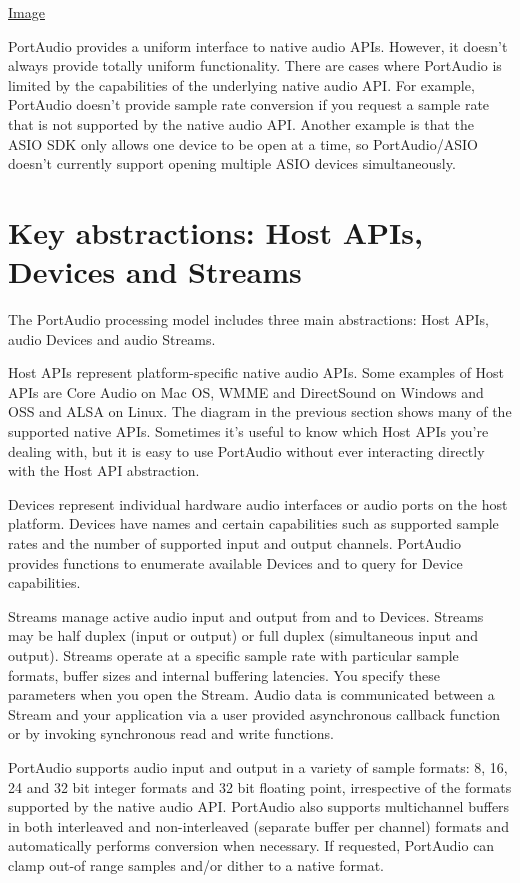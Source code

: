 \documentclass[a4paper]{report}
\begin{document}
\href{./img/portaudio-external-architecture-diagram.png}{Image}


PortAudio provides a uniform interface to native audio APIs. However, it doesn't always provide totally uniform functionality. There are cases where PortAudio is limited by the capabilities of the underlying native audio API. For example, PortAudio doesn't provide sample rate conversion if you request a sample rate that is not supported by the native audio API. Another example is that the ASIO SDK only allows one device to be open at a time, so PortAudio/ASIO doesn't currently support opening multiple ASIO devices simultaneously.\section{Key abstractions: Host APIs, Devices and Streams} \label{d0d0e0e0e0e3}
The PortAudio processing model includes three main abstractions: Host APIs, audio Devices and audio Streams.


Host APIs represent platform-specific native audio APIs. Some examples of Host APIs are Core Audio on Mac OS, WMME and DirectSound on Windows and OSS and ALSA on Linux. The diagram in the previous section shows many of the supported native APIs. Sometimes it's useful to know which Host APIs you're dealing with, but it is easy to use PortAudio without ever interacting directly with the Host API abstraction.


Devices represent individual hardware audio interfaces or audio ports on the host platform. Devices have names and certain capabilities such as supported sample rates and the number of supported input and output channels. PortAudio provides functions to enumerate available Devices and to query for Device capabilities.


Streams manage active audio input and output from and to Devices. Streams may be half duplex (input or output) or full duplex (simultaneous input and output). Streams operate at a specific sample rate with particular sample formats, buffer sizes and internal buffering latencies. You specify these parameters when you open the Stream. Audio data is communicated between a Stream and your application via a user provided asynchronous callback function or by invoking synchronous read and write functions.


PortAudio supports audio input and output in a variety of sample formats: 8, 16, 24 and 32 bit integer formats and 32 bit floating point, irrespective of the formats supported by the native audio API. PortAudio also supports multichannel buffers in both interleaved and non-interleaved (separate buffer per channel) formats and automatically performs conversion when necessary. If requested, PortAudio can clamp out-of range samples and/or dither to a native format.
\end{document}
